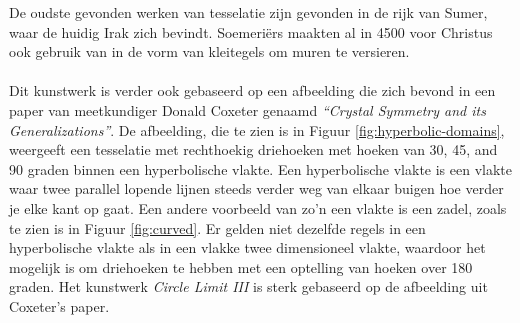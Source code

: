 \documentclass{article}
\begin{document}
De oudste gevonden werken van tesselatie zijn gevonden in de rijk van Sumer, waar de huidig Irak zich bevindt. Soemeri\"ers maakten al in 4500 voor Christus ook gebruik van in de vorm van kleitegels om muren te versieren.
\\ \\
Dit kunstwerk is verder ook gebaseerd op een afbeelding die zich bevond in een paper van meetkundiger Donald Coxeter genaamd \textit{``Crystal Symmetry and its Generalizations''}. De afbeelding, die te zien is in Figuur \ref{fig:hyperbolic-domains}, weergeeft een tesselatie met rechthoekig driehoeken met hoeken van 30, 45, and 90 graden binnen een hyperbolische vlakte.
Een hyperbolische vlakte is een vlakte waar twee parallel lopende lijnen steeds verder weg van elkaar buigen hoe verder je elke kant op gaat. Een andere voorbeeld van zo'n een vlakte is een zadel, zoals te zien is in Figuur \ref{fig:curved}. Er gelden niet dezelfde regels in een hyperbolische vlakte als in een vlakke twee dimensioneel vlakte, waardoor het mogelijk is om driehoeken te hebben met een optelling van hoeken over 180 graden. Het kunstwerk \textit{Circle Limit III} is sterk gebaseerd op de afbeelding uit Coxeter's paper.
\end{document}
